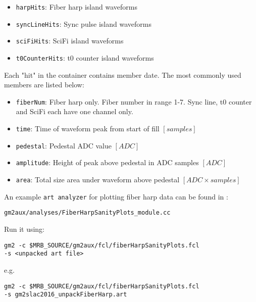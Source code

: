 \begin{itemize}
\item \verb+harpHits+: Fiber harp island waveforms
\item \verb+syncLineHits+: Sync pulse island waveforms
\item \verb+sciFiHits+: SciFi island waveforms
\item \verb+t0CounterHits+: t0 counter island waveforms
\end{itemize}

Each "hit" in the container contains member date. The most commonly used members are listed below:

\begin{itemize}
\item \verb+fiberNum+: Fiber harp only. Fiber number in range 1-7. Sync line, t0 counter and SciFi each have one channel only.
\item \verb+time+: Time of waveform peak from start of fill $[samples]$
\item \verb+pedestal+: Pedestal ADC value $[ADC]$
\item \verb+amplitude+: Height of peak above pedestal in ADC samples $[ADC]$
\item \verb+area+: Total size area under waveform above pedestal $[ADC \times samples]$
\end{itemize}

An example \verb+art analyzer+ for plotting fiber harp data can be found in :
%
\begin{Verbatim}[frame=single]
gm2aux/analyses/FiberHarpSanityPlots_module.cc
\end{Verbatim}
%
Run it using:
%
\begin{Verbatim}[frame=single]
gm2 -c $MRB_SOURCE/gm2aux/fcl/fiberHarpSanityPlots.fcl 
-s <unpacked art file>
\end{Verbatim}
%

e.g.

%
\begin{Verbatim}[frame=single]
gm2 -c $MRB_SOURCE/gm2aux/fcl/fiberHarpSanityPlots.fcl 
-s gm2slac2016_unpackFiberHarp.art
\end{Verbatim}
%







